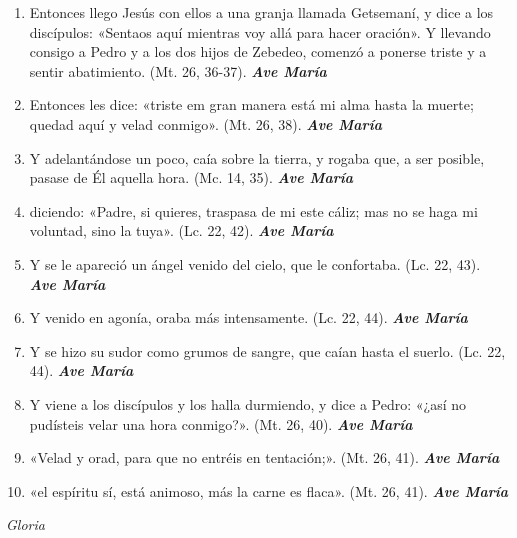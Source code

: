 \documentclass[a4paper,11pt, oneside]{report}
\begin{document}
\begin{enumerate}

  \item Entonces llego Jesús con ellos a una granja llamada Getsemaní, y dice a los discípulos: «Sentaos aquí mientras voy allá para hacer oración». 
  Y llevando consigo a Pedro y a los dos hijos de Zebedeo, comenzó a ponerse triste y a sentir abatimiento. (Mt. 26, 36-37). \textbf{\textit{Ave María}}

  \item Entonces les dice: «triste em gran manera está mi alma hasta la muerte; quedad aquí y velad conmigo». (Mt. 26, 38). \textbf{\textit{Ave María}}

  \item Y adelantándose un poco, caía sobre la tierra, y rogaba que, a ser posible, pasase de Él aquella hora. (Mc. 14, 35). \textbf{\textit{Ave María}}

  \item diciendo: «Padre, si quieres, traspasa de mi este cáliz; mas no se haga mi voluntad, sino la tuya». (Lc. 22, 42). \textbf{\textit{Ave María}}

  \item Y se le apareció un ángel venido del cielo, que le confortaba. (Lc. 22, 43). \textbf{\textit{Ave María}}

  \item Y venido en agonía, oraba más intensamente. (Lc. 22, 44). \textbf{\textit{Ave María}}

  \item Y se hizo su sudor como grumos de sangre, que caían hasta el suerlo. (Lc. 22, 44). \textbf{\textit{Ave María}}

  \item Y viene a los discípulos y los halla durmiendo, y dice a Pedro: «¿así no pudísteis velar una hora conmigo?». (Mt. 26, 40). \textbf{\textit{Ave María}}

  \item «Velad y orad, para que no entréis en tentación;». (Mt. 26, 41). \textbf{\textit{Ave María}}

  \item «el espíritu sí, está animoso, más la carne es flaca». (Mt. 26, 41). \textbf{\textit{Ave María}}

\end{enumerate}

\indent\textit{Gloria} \par
\end{document}
